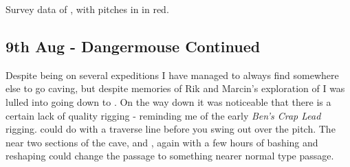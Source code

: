 \begin{survey}
\centering
{}
\caption[Dangermouse]{Survey data of , with pitches in  in red.}
\label{Dangermouse survey}
\end{survey}


\subsection{9th Aug - Dangermouse Continued}



Despite being on several expeditions I have managed to always find somewhere else to go caving, but despite memories of Rik and Marcin's exploration of  I was lulled into going down to
. On the way down  it was noticeable that there is a certain lack of quality rigging - reminding me of the early \textit{Ben's Crap Lead} rigging.  could do with a traverse line before you
swing out over the pitch. The near two sections of the cave,
 and , again with a few hours of bashing and reshaping could change the passage to something nearer normal type passage.

